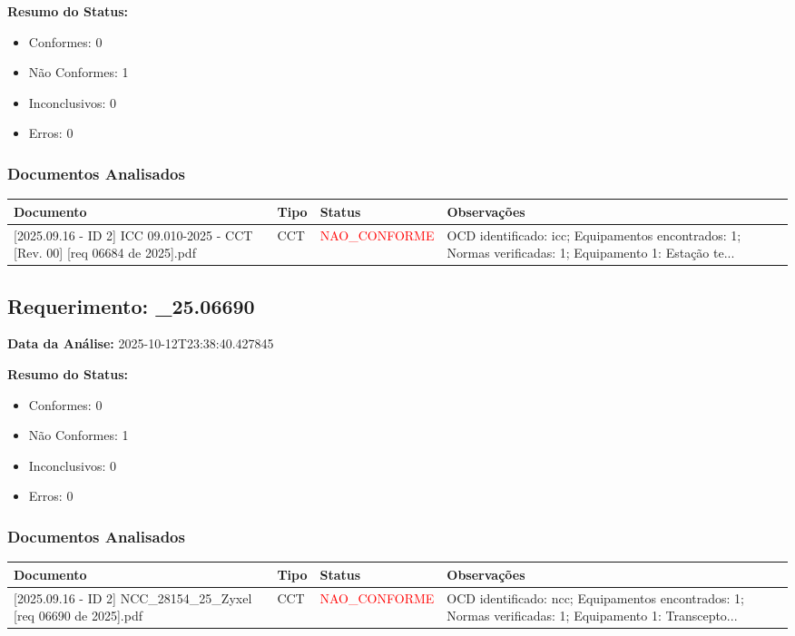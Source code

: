 \documentclass[12pt,a4paper]{article}
\begin{document}
\textbf{Resumo do Status:}
\begin{itemize}
    \item Conformes: 0
    \item Não Conformes: 1
    \item Inconclusivos: 0
    \item Erros: 0
\end{itemize}

\subsubsection{Documentos Analisados}

\begin{longtable}{|p{4cm}|p{2cm}|p{2cm}|p{6cm}|}
\hline
\textbf{Documento} & \textbf{Tipo} & \textbf{Status} & \textbf{Observações} \\
\hline
\endhead
[Certificado de Conformidade Técnica - CCT][2025.09.16 - ID 2] ICC 09.010-2025 - CCT [Rev. 00] [req 06684 de  2025].pdf & CCT & \textcolor{red}{NAO\_CONFORME} & OCD identificado: icc; Equipamentos encontrados: 1; Normas verificadas: 1; Equipamento 1: Estação te... \\
\hline
\end{longtable}


\subsection{Requerimento: \_25.06690}

\textbf{Data da Análise:} 2025-10-12T23:38:40.427845

\textbf{Resumo do Status:}
\begin{itemize}
    \item Conformes: 0
    \item Não Conformes: 1
    \item Inconclusivos: 0
    \item Erros: 0
\end{itemize}

\subsubsection{Documentos Analisados}

\begin{longtable}{|p{4cm}|p{2cm}|p{2cm}|p{6cm}|}
\hline
\textbf{Documento} & \textbf{Tipo} & \textbf{Status} & \textbf{Observações} \\
\hline
\endhead
[Certificado de Conformidade Técnica - CCT][2025.09.16 - ID 2] NCC\_28154\_25\_Zyxel [req 06690 de 2025].pdf & CCT & \textcolor{red}{NAO\_CONFORME} & OCD identificado: ncc; Equipamentos encontrados: 1; Normas verificadas: 1; Equipamento 1: Transcepto... \\
\hline
\end{longtable}
\end{document}
